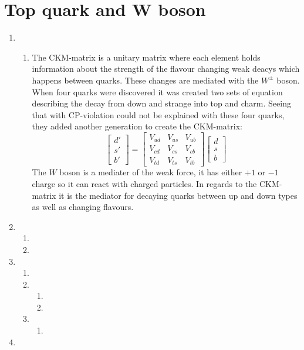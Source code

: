 \section{Top quark and W boson}

\begin{enumerate}
  \item
    \begin{enumerate}
      \item
	The CKM-matrix is a unitary matrix where each element holds information about the
      	strength of the flavour changing weak deacys which happens between quarks.
      	These changes are mediated with the $W^{\pm}$ boson.
      	When four quarks were discovered it was created two sets of equation describing
      	the decay from down and strange into top and charm.
      	Seeing that with CP-violation could not be explained with these four quarks,
      	they added another generation to create the CKM-matrix:
      	\begin{equation}
      	\begin{bmatrix}
      	  d'\\
      	  s'\\
      	  b'
      	\end{bmatrix}
      	=
      	\begin{bmatrix}
      	  V_{ud} & V_{us} & V_{ub} \\
      	  V_{cd} & V_{cs} & V_{cb} \\
      	  V_{td} & V_{ts} & V_{tb} 
      	\end{bmatrix}
      	\begin{bmatrix}
      	  d\\
      	  s\\
      	  b
      	\end{bmatrix}
      	\end{equation}
      	The $W$ boson is a mediater of the weak force, it has either $+1$ or $-1$ charge so it
	can react with charged particles. In regards to the CKM-matrix it is the mediator for
	decaying quarks between up and down types as well as changing flavours.
    \end{enumerate}
  \item
    \begin{enumerate}
      \item
      \item
    \end{enumerate}
  \item
    \begin{enumerate}
      \item
      \item
	\begin{enumerate}
	  \item
	  \item
	\end{enumerate}
      \item
	\begin{enumerate}
	  \item
	\end{enumerate}
    \end{enumerate}
  \item
\end{enumerate}
